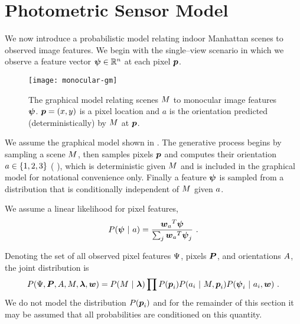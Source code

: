 \section{Photometric Sensor Model}

We now introduce a probabilistic model relating indoor Manhattan
scenes to observed image features. We begin with the single--view
scenario in which we observe a feature vector $\Feature\in\Reals^n$ at
each pixel $\Pixel$. 

\begin{figure}[tb]
  \centering
  \texttt{[image: monocular-gm]}
  \caption{The graphical model relating scenes $\Scene$ to monocular
    image features $\Feature$. $\Pixel=(x,y)$ is a pixel location and
    $a$ is the orientation predicted (deterministically) by $\Scene$
    at $\Pixel$.}
  \label{fig:monocular-gm}
\end{figure}

We assume the graphical model shown in . The
generative process begins by sampling a scene $\Scene$, then samples
pixels $\Pixel$ and computes their orientation
$\Orient\in\Orientations$ (\cf
{}), which is deterministic given $\Scene$
and is included in the graphical model for notational convenience
only. Finally a feature $\Feature$ is sampled from a distribution that
is conditionally independent of $\Scene$ given $\Orient$.

We assume a linear likelihood for pixel features,
\begin{equation}
\label{eq:feature-likelihood}
  P(\Feature ~|~ \Orient) = 
    \frac{{\PixelModel_\Orient}^T\Feature}
          {\sum_j{\PixelModel_\Orient}^T\Feature_j} ~.
\end{equation}

Denoting the set of all observed pixel
features $\Features$, pixels $\Pixels$, and orientations $\Orients$,
the joint distribution is
\begin{equation}
  P(\Features, \Pixels, \Orients, \Scene, \Penalties, \PixelModel) =
    P(\Scene ~|~ \Penalties) 
    \prod P(\Pixel_i)
          P(\Orient_i ~|~ \Scene, \Pixel_i)
          P(\Feature_i ~|~ \Orient_i, \PixelModel) ~.
\end{equation}
We do not model the distribution $P(\Pixel_i)$ and for the remainder
of this section it may be assumed that all probabilities are
conditioned on this quantity.

